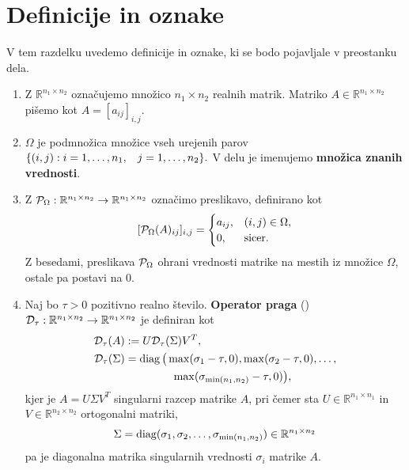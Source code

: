 \section{Definicije in oznake} \label{2607-1502}
V tem razdelku uvedemo definicije in oznake, ki se bodo pojavljale v preostanku dela.
\begin{enumerate}
  \item Z $\mathbb{R}^{n_1\times n_2}$ označujemo množico $n_1\times n_2$ realnih matrik. Matriko $A\in \mathbb{R}^{n_1\times n_2}$ pišemo kot $A=[a_{ij}]_{i,j}$.
  \item $\Omega$ je podmnožica množice vseh urejenih parov $\{ (i, j) : i = 1, \hdots , n_1, \hspace{0.3cm} j = 1, \hdots, n_2 \}.$ V delu je imenujemo \textbf{množica znanih vrednosti}.
  \item
        Z $\mathcal{P}_\Omega:\mathbb{R}^{n_1\times n_2}\to \mathbb{R}^{n_1\times n_2}$
        označimo preslikavo, definirano kot
        \[ [\mathcal{P}_\Omega(A)_{ij}]_{i,j} = \begin{cases}
            a_{ij}, & (i, j) \in \Omega, \\
            0,      & \text{sicer}.
          \end{cases}
        \]
        Z besedami, preslikava $\mathcal{P}_\Omega$ ohrani vrednosti matrike na mestih iz množice $\Omega$, ostale pa postavi na 0.
  \item Naj bo $\tau > 0$ pozitivno realno število.
        \textbf{Operator praga} (\cite{CCS}) $\mathcal{D}_\tau: \mathbb{R}^{n_1 \times n_2} \rightarrow \mathbb{R}^{n_1 \times n_2}$ je definiran kot
        \begin{align}
          \label{1007-1959}
          \begin{split}
            \mathcal{D}_\tau(A) &:= U \mathcal{D}_\tau(\Sigma) V^T, \\ \mathcal{D}_\tau(\Sigma) &= \operatorname{diag}\big(\max(\sigma_1 - \tau, 0),
            \max(\sigma_2-\tau,0),\ldots,\\
            &\hspace{1.5cm}
            \max(\sigma_{\min(n_1,n_2)}-\tau,0)\big),
          \end{split}
        \end{align}
        kjer je $A=U\Sigma V^T$
        singularni razcep matrike $A$, pri čemer sta $U\in \mathbb{R}^{n_1\times n_1}$
        in $V\in \mathbb R^{n_2\times n_2}$ ortogonalni matriki,
        $$\Sigma=\operatorname{diag}(\sigma_1,\sigma_2,\ldots,\sigma_{\min(n_1,n_2)})\in \mathbb R^{n_1\times n_2}$$ pa je diagonalna matrika singularnih vrednosti $\sigma_i$ matrike $A$.

\end{enumerate}
